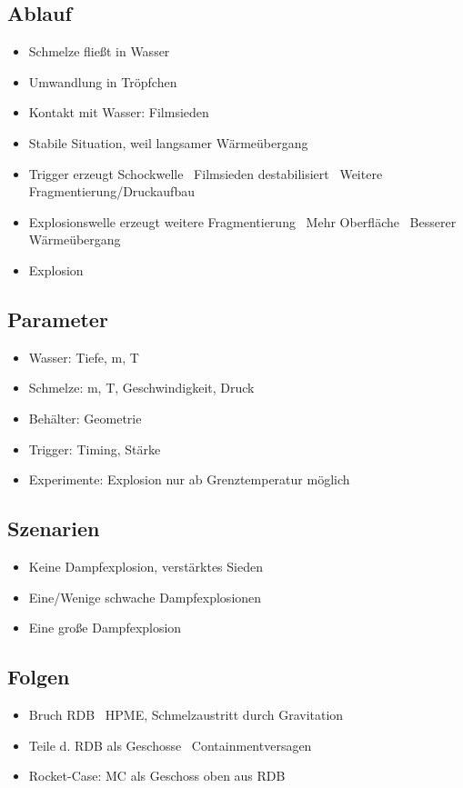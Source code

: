\documentclass[12pt]{article}
\begin{document}
\subsection{Ablauf}
\begin{itemize}
  \item Schmelze fließt in Wasser
  \item Umwandlung in Tröpfchen
  \item Kontakt mit Wasser: Filmsieden
  \item Stabile Situation, weil langsamer Wärmeübergang
  \item Trigger erzeugt Schockwelle \textrightarrow\ Filmsieden destabilisiert \textrightarrow\ Weitere Fragmentierung/Druckaufbau
  \item Explosionswelle erzeugt weitere Fragmentierung \textrightarrow\ Mehr Oberfläche \textrightarrow\ Besserer Wärmeübergang
  \item Explosion
\end{itemize}

\subsection{Parameter}
\begin{itemize}
  \item Wasser: Tiefe, m, T
  \item Schmelze: m, T, Geschwindigkeit, Druck
  \item Behälter: Geometrie
  \item Trigger: Timing, Stärke
  \item Experimente: Explosion nur ab Grenztemperatur möglich
\end{itemize}

\subsection{Szenarien}
\begin{itemize}
  \item Keine Dampfexplosion, verstärktes Sieden
  \item Eine/Wenige schwache Dampfexplosionen
  \item Eine große Dampfexplosion
\end{itemize}

\subsection{Folgen}
\begin{itemize}
  \item Bruch RDB \textrightarrow\ HPME, Schmelzaustritt durch Gravitation
  \item Teile d. RDB als Geschosse \textrightarrow\ Containmentversagen
  \item Rocket-Case: MC als Geschoss oben aus RDB
\end{itemize}
\end{document}
